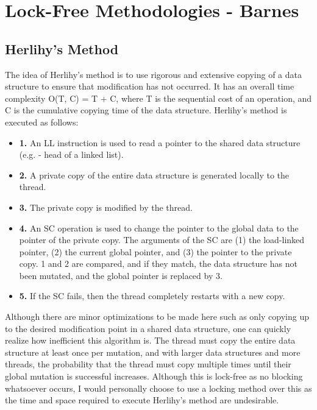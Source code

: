 \documentclass{article}
\begin{document}
\section*{Lock-Free Methodologies - Barnes \cite{Barnes}}

\subsection*{Herlihy's Method}
The idea of Herlihy's method is to use rigorous and extensive copying of a data structure to ensure that modification has not occurred. It has an overall time complexity O(T, C) = T + C, where T is the sequential cost of an operation, and C is the cumulative copying time of the data structure. Herlihy's method is executed as follows:
\begin{itemize}
    \item \textbf{1.} An LL instruction is used to read a pointer to the shared data structure (e.g. - head of a linked list).
    \item \textbf{2.} A private copy of the entire data structure is generated locally to the thread.
    \item \textbf{3.} The private copy is modified by the thread.
    \item \textbf{4.} An SC operation is used to change the pointer to the global data to the pointer of the private copy. The arguments of the SC are (1) the load-linked pointer, (2) the current global pointer, and (3) the pointer to the private copy. 1 and 2 are compared, and if they match, the data structure has not been mutated, and the global pointer is replaced by 3.
    \item \textbf{5.} If the SC fails, then the thread completely restarts with a new copy.
\end{itemize}
Although there are minor optimizations to be made here such as only copying up to the desired modification point in a shared data structure, one can quickly realize how inefficient this algorithm is. The thread must copy the entire data structure at least once per mutation, and with larger data structures and more threads, the probability that the thread must copy multiple times until their global mutation is successful increases. Although this is lock-free as no blocking whatsoever occurs, I would personally choose to use a locking method over this as the time and space required to execute Herlihy's method are undesirable.
\end{document}
